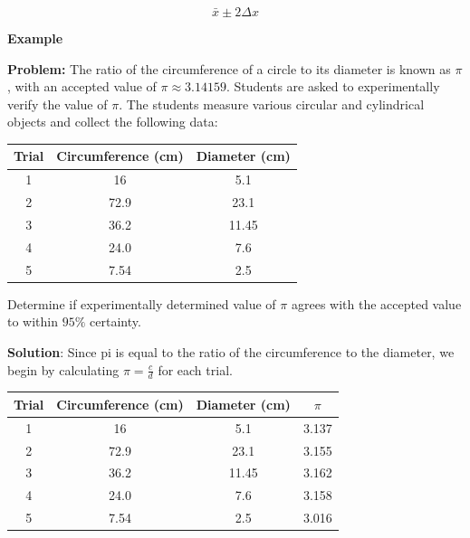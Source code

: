 	\begin{mdframed}[backgroundcolor=orange!20!white]
 	\begin{equation}
		\bar{x} \pm 2 \Delta x 
		\label{equation:95pct}
	\end{equation}
\end{mdframed}
	
	\newpage
	\begin{mdframed}[backgroundcolor=blue!10!white]
		\begin{center}	
			\textbf{Example \thesection}	
		\end{center}
		
		\textbf{Problem:} The ratio of the circumference of a circle to its diameter is known as $\pi$, with an accepted value of $\pi \approx 3.14159$.  Students are asked to experimentally verify the value of $\pi$.  The students measure various circular and cylindrical objects and collect the following data:
		
		\begin{center}
			

		\begin{tabular}{|c|c|c|}
			\hline
			Trial & Circumference (cm) & Diameter (cm) \\
			\hline
		1 & 16 & 5.1 \\
		\hline
		2 & 72.9 & 23.1 \\
		\hline
		3 & 36.2 & 11.45 \\
		\hline 
		4 & 24.0 & 7.6 \\
		\hline
		5 & 7.54 & 2.5 \\
		\hline
		\end{tabular}
		\end{center}		
		
		Determine if experimentally determined value of $\pi$ agrees with the accepted value to within $95\%$ certainty.  
		
		\vspace{0.2 in} 
		\textbf{Solution}: Since pi is equal to the ratio of the circumference to the diameter, we begin by calculating $\pi = \frac{c}{d}$ for each trial.
		
			
		\begin{center}
			
			
			\begin{tabular}{|c|c|c|c|}
				\hline
				Trial & Circumference (cm) & Diameter (cm) &\color{blue} $\pi$ \color{black}\\
				\hline
				1 & 16 & 5.1 & \color{blue} 3.137 \color{black} \\
				\hline
				2 & 72.9 & 23.1 & \color{blue} 3.155 \color{black} \\
				\hline
				3 & 36.2 & 11.45 & \color{blue} 3.162 \color{black} \\
				\hline 
				4 & 24.0 & 7.6 & \color{blue} 3.158 \color{black} \\
				\hline
				5 & 7.54 & 2.5 & \color{blue} 3.016 \color{black} \\
				\hline
			\end{tabular}
		\end{center}	
		

\end{mdframed}

